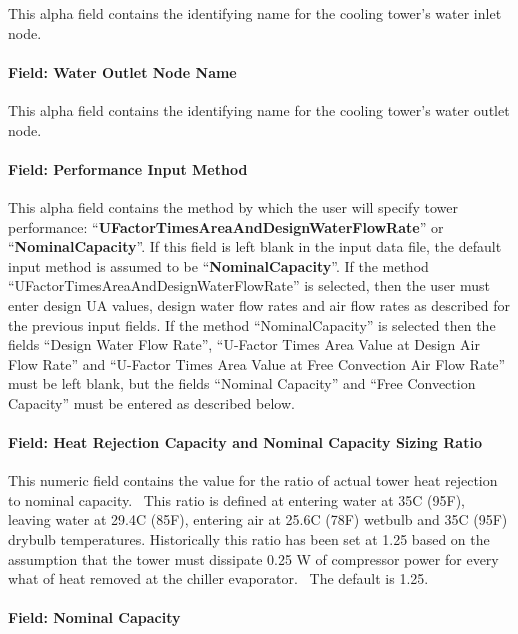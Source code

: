 This alpha field contains the identifying name for the cooling tower's water inlet node.

\paragraph{Field: Water Outlet Node Name}\label{field-water-outlet-node-name-2}

This alpha field contains the identifying name for the cooling tower's water outlet node.

\paragraph{Field: Performance Input Method}\label{field-performance-input-method-2}

This alpha field contains the method by which the user will specify tower performance: ``\textbf{UFactorTimesAreaAndDesignWaterFlowRate}'' or ``\textbf{NominalCapacity}''.
If this field is left blank in the input data file, the default input method is assumed to be ``\textbf{NominalCapacity}''.
If the method ``UFactorTimesAreaAndDesignWaterFlowRate'' is selected, then the user must enter design UA values, design water flow rates and air flow rates as described for the previous input fields.
If the method ``NominalCapacity'' is selected then the fields ``Design Water Flow Rate'', ``U-Factor Times Area Value at Design Air Flow Rate'' and ``U-Factor Times Area Value at Free Convection Air Flow Rate'' must be left blank, but the fields ``Nominal Capacity'' and ``Free Convection Capacity'' must be entered as described below.

\paragraph{Field: Heat Rejection Capacity and Nominal Capacity Sizing Ratio}\label{field-heat-rejection-capacity-and-nominal-capacity-sizing-ratio-2}

This numeric field contains the value for the ratio of actual tower heat rejection to nominal capacity.~ This ratio is defined at entering water at 35C (95F), leaving water at 29.4C (85F), entering air at 25.6C (78F) wetbulb and 35C (95F) drybulb temperatures. Historically this ratio has been set at 1.25 based on the assumption that the tower must dissipate 0.25 W of compressor power for every what of heat removed at the chiller evaporator.~ The default is 1.25.

\paragraph{Field: Nominal Capacity}\label{field-nominal-capacity-1}

